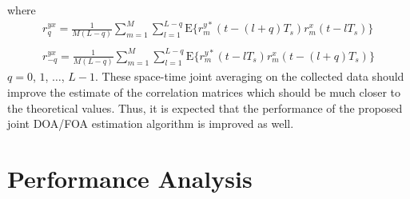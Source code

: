 \documentclass[conference]{IEEEtran}
\begin{document}
\noindent where
\begin{equation}
\begin{array}{l}
r_q^{yx}=\frac{1}{M(L-q)}\sum\limits_{m=1}^{M}\sum\limits_{l=1}^{L-q}\mbox{E}\{r_m^{y\ast}(t-(l+q)T_s)r_m^x(t-lT_s)\}\\
\\
r_{-q}^{yx}=\frac{1}{M(L-q)}\sum\limits_{m=1}^{M}\sum\limits_{l=1}^{L-q}\mbox{E}\{r_m^{y\ast}(t-lT_s)r_m^x(t-(l+q)T_s)\}
\end{array}
\end{equation}
\noindent $q=0$, $1$, $\ldots$, $L-1$. These space-time joint
averaging on the collected data should improve the estimate of the
correlation matrices which should be much closer to the
theoretical values. Thus, it is expected that the performance of
the proposed joint DOA/FOA estimation algorithm is improved as
well.
\section{Performance Analysis}
\end{document}
